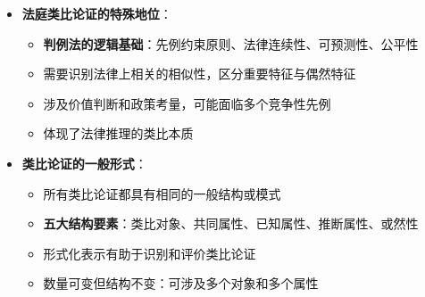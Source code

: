 \begin{center}
{{\begin{itemize}
\begin{itemize}
  \item \textbf{逻辑形式}：前提1（A和B在P、Q方面相似）+前提2（A具有R）→结论（B可能具有R）
  \item 不同相似方面在论证中起不同作用：基础相似性vs推断相似性
  \item 结论的或然性是类比论证的本质特征
  \end{itemize}
\item \textbf{法庭类比论证的特殊地位}：
  \begin{itemize}
  \item \textbf{判例法的逻辑基础}：先例约束原则、法律连续性、可预测性、公平性
  \item 需要识别法律上相关的相似性，区分重要特征与偶然特征
  \item 涉及价值判断和政策考量，可能面临多个竞争性先例
  \item 体现了法律推理的类比本质
  \end{itemize}
\item \textbf{类比论证的一般形式}：
  \begin{itemize}
  \item 所有类比论证都具有相同的一般结构或模式
  \item \textbf{五大结构要素}：类比对象、共同属性、已知属性、推断属性、或然性
  \item 形式化表示有助于识别和评价类比论证
  \item 数量可变但结构不变：可涉及多个对象和多个属性
  \end{itemize}
\end{itemize}
}}
\end{center}